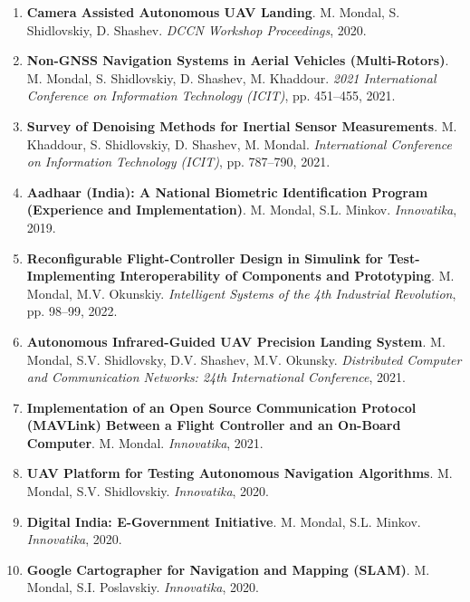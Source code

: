 \begin{enumerate}[leftmargin=*,noitemsep,nolistsep]

\item \textbf{Camera Assisted Autonomous UAV Landing}.  
M. Mondal, S. Shidlovskiy, D. Shashev. \textit{DCCN Workshop Proceedings}, 2020.

\item \textbf{Non-GNSS Navigation Systems in Aerial Vehicles (Multi-Rotors)}.  
M. Mondal, S. Shidlovskiy, D. Shashev, M. Khaddour. \textit{2021 International Conference on Information Technology (ICIT)}, pp. 451--455, 2021.

\item \textbf{Survey of Denoising Methods for Inertial Sensor Measurements}.  
M. Khaddour, S. Shidlovskiy, D. Shashev, M. Mondal. \textit{International Conference on Information Technology (ICIT)}, pp. 787--790, 2021.

\item \textbf{Aadhaar (India): A National Biometric Identification Program (Experience and Implementation)}.  
M. Mondal, S.L. Minkov. \textit{Innovatika}, 2019.

\item \textbf{Reconfigurable Flight-Controller Design in Simulink for Test-Implementing Interoperability of Components and Prototyping}.  
M. Mondal, M.V. Okunskiy. \textit{Intelligent Systems of the 4th Industrial Revolution}, pp. 98--99, 2022.

\item \textbf{Autonomous Infrared-Guided UAV Precision Landing System}.  
M. Mondal, S.V. Shidlovsky, D.V. Shashev, M.V. Okunsky. \textit{Distributed Computer and Communication Networks: 24th International Conference}, 2021.

\item \textbf{Implementation of an Open Source Communication Protocol (MAVLink) Between a Flight Controller and an On-Board Computer}.  
M. Mondal. \textit{Innovatika}, 2021.

\item \textbf{UAV Platform for Testing Autonomous Navigation Algorithms}.  
M. Mondal, S.V. Shidlovskiy. \textit{Innovatika}, 2020.

\item \textbf{Digital India: E-Government Initiative}.  
M. Mondal, S.L. Minkov. \textit{Innovatika}, 2020.

\item \textbf{Google Cartographer for Navigation and Mapping (SLAM)}.  
M. Mondal, S.I. Poslavskiy. \textit{Innovatika}, 2020.


\end{enumerate}
